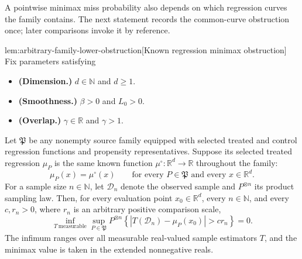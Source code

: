 \documentclass[11pt]{article}
\begin{document}
A pointwise minimax miss probability also depends on which regression curves the family contains. The next statement records the common-curve obstruction once; later comparisons invoke it by reference.

\begin{lemmav}{lem:arbitrary-family-lower-obstruction}[Known regression minimax obstruction]
Fix parameters satisfying
\begin{itemize}
\item \textbf{(Dimension.)} \(d\in\mathbb N\) and \(d\ge1\).
\item \textbf{(Smoothness.)} \(\beta>0\) and \(L_0>0\).
\item \textbf{(Overlap.)} \(\gamma\in\mathbb R\) and \(\gamma>1\).
\end{itemize}
Let \(\mathfrak P\) be any nonempty source family equipped with selected treated and control regression functions and propensity representatives. Suppose its selected treated regression \(\mu_P\) is the same known function \(\mu^\circ:\mathbb R^d\to\mathbb R\) throughout the family:
\[
\mu_P(x)=\mu^\circ(x)
\qquad
\text{for every }P\in\mathfrak P
\text{ and every }x\in\mathbb R^d.
\]
For a sample size \(n\in\mathbb N\), let \(\mathcal D_n\) denote the observed sample and \(P^{\otimes n}\) its product sampling law. Then, for every evaluation point \(x_0\in\mathbb R^d\), every \(n\in\mathbb N\), and every \(c,r_n>0\), where \(r_n\) is an arbitrary positive comparison scale,
\[
\inf_{T\ \mathrm{measurable}}
\sup_{P\in\mathfrak P}
P^{\otimes n}
\left\{\left|T(\mathcal D_n)-\mu_P(x_0)\right|>c r_n\right\}
=0.
\]
The infimum ranges over all measurable real-valued sample estimators \(T\), and the minimax value is taken in the extended nonnegative reals.


\end{lemmav}
\end{document}
